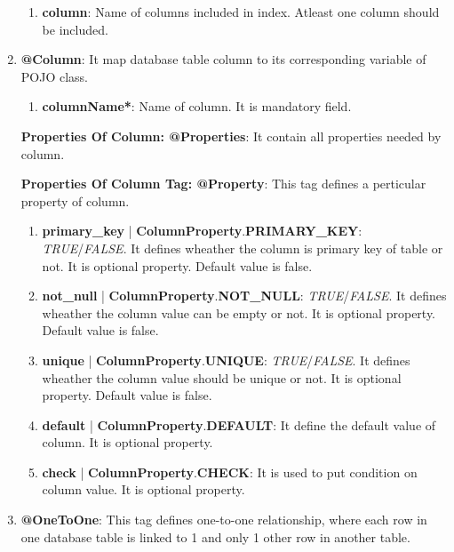 \begin{enumerate}
\begin{enumerate}
			\item \small \textbf{column}: Name of columns included in index. Atleast one column should be included.

		\end{enumerate}

	\item \small \textbf{@Column}: It map database table column to its corresponding variable of POJO class.

		\begin{enumerate}

			\item \small \textbf{columnName*}: Name of column. It is mandatory field.

		\end{enumerate}

		\par
		\textbf{Properties Of Column: @Properties}: It contain all properties needed by column.
	
		\par
		\textbf{Properties Of Column Tag: @Property}: This tag defines a perticular property of column.

		\begin{enumerate}

			\item \small \textbf{primary\_key} | \textbf{ColumnProperty}.\textbf{PRIMARY\_KEY}: \textit{TRUE}/\textit{FALSE}. It defines wheather the column is primary key of table or not. It is optional property. Default value is false.
			\item \small \textbf{not\_null} | \textbf{ColumnProperty}.\textbf{NOT\_NULL}: \textit{TRUE}/\textit{FALSE}. It defines wheather the column value can be empty or not. It is optional property. Default value is false.
			\item \small \textbf{unique} | \textbf{ColumnProperty}.\textbf{UNIQUE}: \textit{TRUE}/\textit{FALSE}. It defines wheather the column value should be unique or not. It is optional property. Default value is false.
			\item \small \textbf{default} | \textbf{ColumnProperty}.\textbf{DEFAULT}: It define the default value of column. It is optional property.
			\item \small \textbf{check} | \textbf{ColumnProperty}.\textbf{CHECK}: It is used to put condition on column value. It is optional property.

		\end{enumerate}

	\item \small \textbf{@OneToOne}: This tag defines one-to-one relationship, where each row in one database table is linked to 1 and only 1 other row in another table.


\end{enumerate}
